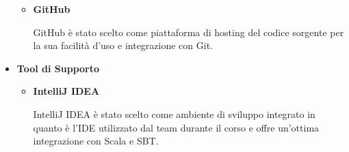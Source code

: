 \begin{itemize}
\begin{itemize}
        \item \textbf{GitHub}\par
        GitHub è stato scelto come piattaforma di hosting del codice
        sorgente per la sua facilità d'uso e integrazione con Git.
    \end{itemize}
    \item \textbf{Tool di Supporto}\par
    \begin{itemize}
        \item \textbf{IntelliJ IDEA}\par
        IntelliJ IDEA è stato scelto come ambiente di sviluppo integrato
        in quanto è l'IDE utilizzato dal team durante il corso e
        offre un'ottima integrazione con Scala e SBT.
    \end{itemize}
\end{itemize}